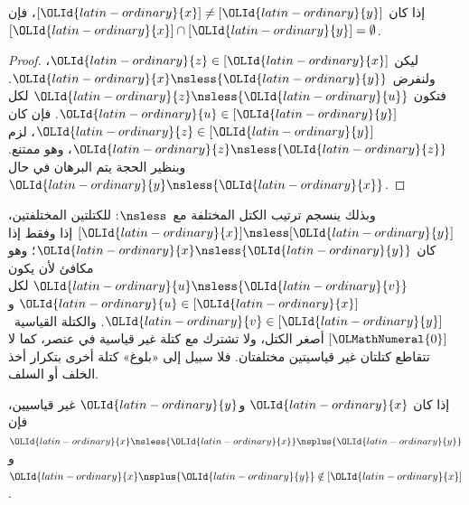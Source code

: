 \documentclass[../../../include/open-logic-section]{subfiles}
\begin{document}
\begin{cor}
إذا كان $[{\OLId{latin-ordinary}{x}}] \neq [{\OLId{latin-ordinary}{y}}]$، فإن $[{\OLId{latin-ordinary}{x}}] \cap [{\OLId{latin-ordinary}{y}}] = \emptyset$.
\end{cor}

\begin{proof}
ليكن ${\OLId{latin-ordinary}{z}} \in [{\OLId{latin-ordinary}{x}}]$، ولنفرض ${\OLId{latin-ordinary}{x}} \nsless {\OLId{latin-ordinary}{y}}$. فتكون
${\OLId{latin-ordinary}{z}} \nsless {\OLId{latin-ordinary}{u}}$ لكل ${\OLId{latin-ordinary}{u}} \in [{\OLId{latin-ordinary}{y}}]$. فإن كان ${\OLId{latin-ordinary}{z}} \in [{\OLId{latin-ordinary}{y}}]$،
لزم ${\OLId{latin-ordinary}{z}} \nsless {\OLId{latin-ordinary}{z}}$، وهو ممتنع. وبنظير الحجة يتم
البرهان في حال ${\OLId{latin-ordinary}{y}} \nsless {\OLId{latin-ordinary}{x}}$.
\end{proof}

\begin{explain}
وبذلك ينسجم ترتيب الكتل المختلفة مع~$\nsless$:
للكتلتين المختلفتين، $[{\OLId{latin-ordinary}{x}}] \nsless [{\OLId{latin-ordinary}{y}}]$ إذا وفقط إذا
كان ${\OLId{latin-ordinary}{x}} \nsless {\OLId{latin-ordinary}{y}}$؛ وهو مكافئ لأن يكون ${\OLId{latin-ordinary}{u}} \nsless {\OLId{latin-ordinary}{v}}$
لكل ${\OLId{latin-ordinary}{u}} \in [{\OLId{latin-ordinary}{x}}]$ و${\OLId{latin-ordinary}{v}} \in [{\OLId{latin-ordinary}{y}}]$. والكتلة القياسية~$[{\OLMathNumeral{0}}]$
أصغر الكتل، ولا تشترك مع كتلة غير قياسية في عنصر،
كما لا تتقاطع كتلتان غير قياسيتين مختلفتان.
فلا سبيل إلى «بلوغ» كتلة أخرى بتكرار أخذ الخلف أو السلف.
\end{explain}

\begin{prop}
إذا كان ${\OLId{latin-ordinary}{x}}$ و${\OLId{latin-ordinary}{y}}$ غير قياسيين، فإن ${\OLId{latin-ordinary}{x}} \nsless {\OLId{latin-ordinary}{x}} \nsplus {\OLId{latin-ordinary}{y}}$ و
${\OLId{latin-ordinary}{x}} \nsplus {\OLId{latin-ordinary}{y}} \notin [{\OLId{latin-ordinary}{x}}]$.
\end{prop}
\end{document}
